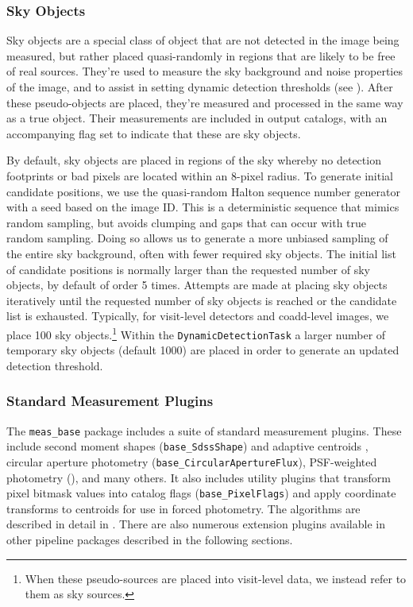 \subsubsection{Sky Objects}
\label{sec:sky-objects}

Sky objects are a special class of object that are not detected in the image being measured, but rather placed quasi-randomly in regions that are likely to be free of real sources.
They're used to measure the sky background and noise properties of the image, and to assist in setting dynamic detection thresholds (see ).
After these pseudo-objects are placed, they're measured and processed in the same way as a true object.
Their measurements are included in output catalogs, with an accompanying flag set to indicate that these are sky objects.

By default, sky objects are placed in regions of the sky whereby no detection footprints or bad pixels are located within an 8-pixel radius.
To generate initial candidate positions, we use the quasi-random Halton sequence number generator with a seed based on the image ID.
This is a deterministic sequence that mimics random sampling, but avoids clumping and gaps that can occur with true random sampling.
Doing so allows us to generate a more unbiased sampling of the entire sky background, often with fewer required sky objects.
The initial list of candidate positions is normally larger than the requested number of sky objects, by default of order 5 times.
Attempts are made at placing sky objects iteratively until the requested number of sky objects is reached or the candidate list is exhausted.
Typically, for visit-level detectors and coadd-level images, we place 100 sky objects.\footnote{When these pseudo-sources are placed into visit-level data, we instead refer to them as sky sources.}
Within the \texttt{DynamicDetectionTask} a larger number of temporary sky objects (default 1000) are placed in order to generate an updated detection threshold.

\subsubsection{Standard Measurement Plugins}
\label{sec:standard-plugins}

The \texttt{meas\_base} package includes a suite of standard measurement plugins.
These include second moment shapes (\texttt{base\_SdssShape}) and adaptive centroids \citep[\texttt{base\_SdssCentroid}]{2003AJ....125.1559P}, circular aperture photometry (\texttt{base\_CircularApertureFlux}), PSF-weighted photometry (), and many others.
It also includes utility plugins that transform pixel bitmask values into catalog flags (\texttt{base\_PixelFlags}) and apply coordinate transforms to centroids for use in forced photometry.
The algorithms are described in detail in \citet{2018PASJ...70S...5B}.
There are also numerous extension plugins available in other pipeline packages described in the following sections.







